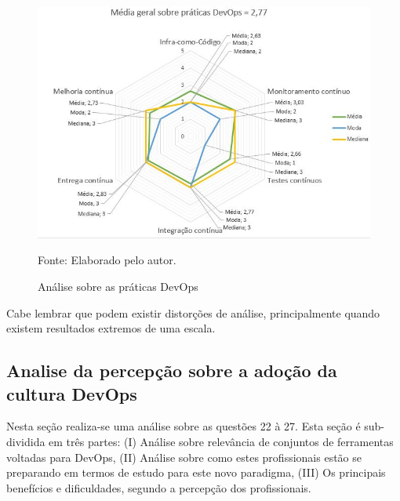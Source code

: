 \documentclass[twoside,english,brazilian]{UNISINOSartigo}
\newcommand{\source}[1]{\caption*{Fonte: {#1}} }
\begin{document}
\begin{figure}[H]
    \centering
    \caption{Análise sobre as práticas DevOps}
       \includegraphics[scale=.6]{imagens/maturidade_radar.JPG}
        \source{Elaborado pelo autor.}
    \label{fig:pratDevOps}
\end{figure}

Cabe lembrar que podem existir distorções de análise, principalmente quando existem resultados extremos de uma escala.

\subsection{Analise da percepção sobre a adoção da cultura DevOps}

Nesta seção realiza-se uma análise sobre as questões 22 à 27. Esta seção é sub-dividida em três partes: (I) Análise sobre relevância de conjuntos de ferramentas voltadas para DevOps, (II) Análise sobre como estes profissionais estão se preparando em termos de estudo para este novo paradigma, (III) Os principais benefícios e dificuldades, segundo a percepção dos profissionais.
\end{document}
